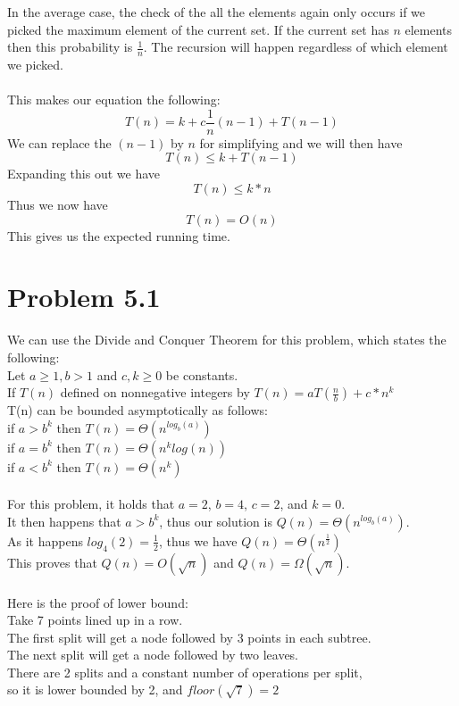 \documentclass[11pt,psfig]{article}
\begin{document}
In the average case, the check of the all the elements again only occurs if we picked the maximum element of the current set. If the current set has $n$ elements then this probability is $\frac{1}{n}$. The recursion will happen regardless of which element we picked. \\
\\
This makes our equation the following:
\[
T(n) = k + c\frac{1}{n}(n-1) + T(n-1)
\]
We can replace the $(n-1)$ by $n$ for simplifying and we will then have
\[
T(n) \leq k + T(n-1)
\]
Expanding this out we have
\[
T(n) \leq k*n
\]
Thus we now have
\[
T(n) = O(n)
\]
This gives us the expected running time. 

\newpage

\section*{Problem 5.1}

We can use the Divide and Conquer Theorem for this problem, which states the following:\\
Let $a \geq 1, b>1$ and $c,k \geq 0$ be constants. \\
If $T(n)$ defined on nonnegative integers by $T(n) = a T(\frac{n}{b}) + c*n^k$\\
T(n) can be bounded asymptotically as follows:\\
if $a > b^k$ then $T(n) = \Theta( n^{log_b(a)} )$\\
if $a = b^k$ then $T(n) = \Theta( n^k log(n) )$\\
if $a < b^k$ then $T(n) = \Theta( n^k )$\\
\\
For this problem, it holds that $a=2$, $b=4$, $c=2$, and $k=0$. \\
It then happens that $a > b^k$, thus our solution is $Q(n) = \Theta( n^{log_b(a)} )$.\\
As it happens $log_4(2)=\frac{1}{2}$, thus we have $Q(n) = \Theta(n^{\frac{1}{2}})$\\
This proves that $Q(n)=O(\sqrt{n})$ and $Q(n)=\Omega(\sqrt{n})$.\\
\\
Here is the proof of lower bound:\\
Take 7 points lined up in a row. \\
The first split will get a node followed by 3 points in each subtree. \\
The next split will get a node followed by two leaves. \\
There are 2 splits and a constant number of operations per split, \\
so it is lower bounded by 2, and $floor(\sqrt{7}) = 2$
\end{document}
